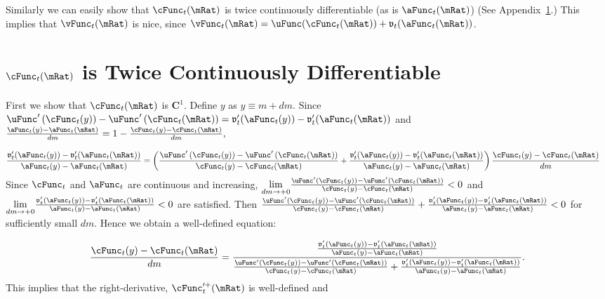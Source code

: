 \documentclass[\econtexRoot/BufferStockTheory]{subfiles}
\begin{document}
Similarly we can easily show that $\cFunc_{t}(\mRat)$ is twice
continuously differentiable (as is $\aFunc_{t}(\mRat)$) (See
Appendix~\ref{sec:CIsTwiceDifferentiable}.)  This implies that
$\vFunc_{t}(\mRat)$ is nice, since
$\vFunc_{t}(\mRat)=\uFunc(\cFunc_{t}(\mRat))+\mathfrak{v}_{t}({\aFunc}_{t}(\mRat))$.

\hypertarget{cFunc-is-Twice-Continuously-Differentiable}{}
\section{$\cFunc_{t}(\mRat)$ is Twice Continuously Differentiable}\label{sec:CIsTwiceDifferentiable}

First we show that $\cFunc_{t}(\mRat)$ is $\mathbf{C}^{1}.$ Define $y$ as
$y\equiv m+dm$.
  Since $\uFunc^{\prime }\left( \cFunc_{t}(y)\right) -\uFunc^{\prime }\left(
    \cFunc_{t}(\mRat)\right) =\mathfrak{v}_{t}^{\prime
  }({\aFunc}_{t}(y))-\mathfrak{v}_{t}^{\prime }({\aFunc}_{t}(\mRat))$ and $
  \frac{{\aFunc}_{t}(y)-{\aFunc}_{t}(\mRat)}{dm}=1-\frac{\cFunc_{t}(y)-\cFunc_{t}(\mRat)}{dm},$
  
\begin{align*}
  \frac{\mathfrak{v}_{t}^{\prime }({\aFunc}_{t}(y))-\mathfrak{v}_{t}^{\prime }({\aFunc}_{t}(\mRat))}{{\aFunc}_{t}(y)-{\aFunc}_{t}(\mRat)} %
  & =   
       \left( \frac{\uFunc^{\prime }\left( \cFunc_{t}(y)\right) -\uFunc^{\prime }\left( \cFunc_{t}(\mRat)\right) }{\cFunc_{t}(y)-\cFunc_{t}(\mRat)}+\frac{\mathfrak{v}_{t}^{\prime }({\aFunc}_{t}(y))-\mathfrak{v}_{t}^{\prime }({\aFunc}_{t}(\mRat))}{{\aFunc}_{t}(y)-{\aFunc}_{t}(\mRat)}\right) \frac{\cFunc_{t}(y)-\cFunc_{t}(\mRat)}{dm}
\end{align*}
Since $\cFunc_{t}$ and $\aFunc_{t}$ are continuous and increasing, $\underset{
dm\rightarrow +0}{\lim }\frac{\uFunc^{\prime }\left( \cFunc_{t}(y)\right) -\uFunc^{\prime
}\left( \cFunc_{t}(\mRat)\right) }{\cFunc_{t}(y)-\cFunc_{t}(\mRat)}<0$ and
$\underset{dm\rightarrow+0}{\lim }\frac{\mathfrak{v}_{t}^{\prime }({\aFunc}_{t}(y))-\mathfrak{v}_{t}^{\prime }({\aFunc}_{t}(\mRat))}{
{\aFunc}_{t}(y)-{\aFunc}_{t}(\mRat)}< 0$
are satisfied. Then $\frac{\uFunc^{\prime }\left(
\cFunc_{t}(y)\right) -\uFunc^{\prime }\left( \cFunc_{t}(\mRat)\right) }{\cFunc_{t}(y)-\cFunc_{t}(\mRat)}+
\frac{\mathfrak{v}_{t}^{\prime }({\aFunc}_{t}(y))-\mathfrak{v}_{t}^{\prime }({\aFunc}_{t}(\mRat))}{{\aFunc}_{t}(y)-{\aFunc}_{t}(\mRat)}
<0$ for sufficiently small $dm$.
 Hence we obtain a well-defined equation:

\begin{equation*}
\frac{\cFunc_{t}(y)-\cFunc_{t}(\mRat)}{dm}=\frac{\frac{\mathfrak{v}_{t}^{\prime
}({\aFunc}_{t}(y))-\mathfrak{v}_{t}^{\prime }({\aFunc}_{t}(\mRat))}{{\aFunc}_{t}(y)-{\aFunc}_{t}(\mRat)}}{\frac{\uFunc^{\prime
}\left( \cFunc_{t}(y)\right) -\uFunc^{\prime }\left( \cFunc_{t}(\mRat)\right) }{
\cFunc_{t}(y)-\cFunc_{t}(\mRat)}+\frac{\mathfrak{v}_{t}^{\prime }({\aFunc}_{t}(y))-\mathfrak{v}_{t}^{\prime }({\aFunc}_{t}(\mRat))
}{{\aFunc}_{t}(y)-{\aFunc}_{t}(\mRat)}}.
\end{equation*}
This implies that the right-derivative, $\cFunc_{t}^{\prime +}(\mRat)$ is
well-defined and
\end{document}
